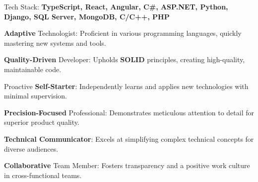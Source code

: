 

\begin{cvlist}
	\item Tech Stack: \textbf{TypeScript, React, Angular, C\#, ASP.NET, Python, Django, SQL Server, MongoDB, C/C++, PHP}
	\item \textbf{Adaptive} Technologist: Proficient in various programming languages, quickly mastering new systems and tools.
	\item \textbf{Quality-Driven} Developer: Upholds \textbf{SOLID} principles, creating high-quality, maintainable code.
	\item Proactive \textbf{Self-Starter}: Independently learns and applies new technologies with minimal supervision.
	\item \textbf{Precision-Focused} Professional: Demonstrates meticulous attention to detail for superior product quality.
	\item \textbf{Technical Communicator}: Excels at simplifying complex technical concepts for diverse audiences.
	\item \textbf{Collaborative} Team Member: Fosters transparency and a positive work culture in cross-functional teams.
\end{cvlist}

